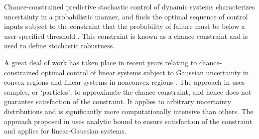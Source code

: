 
Chance-constrained predictive stochastic control of dynamic systems
characterizes uncertainty in a probabilistic manner, and finds the
optimal sequence of control inputs subject to the constraint that the
probability of failure must be below a user-specified
threshold \cite{Blackmore:2011}. This constraint is known as a chance
constraint \cite{Blackmore:2011} and is used to define stochastic
robustness.

A great deal of work has taken place in recent years relating to
chance-constrained optimal control of linear systems subject to
Gaussian uncertainty in convex
regions \cite{Schwarm:1999,Li:2002,Ono:2008} and linear systems in
nonconvex regions \cite{Blackmore:2010,Blackmore:2011}.  The approach
in \cite{Blackmore:2010} uses samples, or ‘particles’, to approximate
the chance constraint, and hence does not guarantee satisfaction of
the constraint. It applies to arbitrary uncertainty distributions and
is significantly more computationally intensive than others. The
approach proposed in \cite{Blackmore:2011} uses analytic bound to
ensure satisfaction of the constraint and applies for linear-Gaussian
systems.

